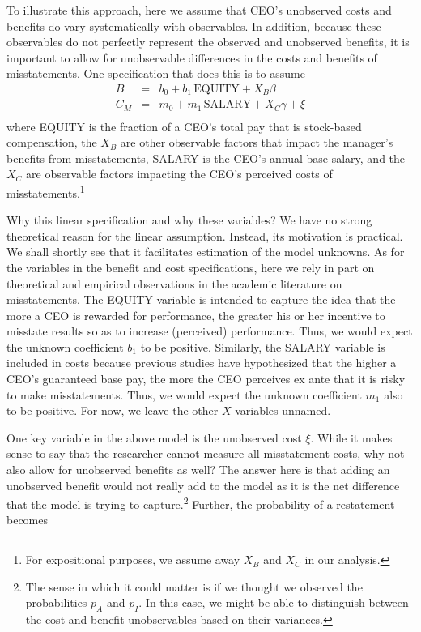 To illustrate this approach, here we assume that CEO's unobserved costs and benefits do vary systematically with observables.
In addition, because these observables do not perfectly represent the observed and unobserved benefits, it is important to allow for unobservable differences in the costs and benefits of misstatements. 
One specification that does this is to assume
\begin{equation}\begin{array}{lcl}\label{eqns1}
B & = & b_0 + b_1 \, \mbox{EQUITY} + X_B\beta\\[.5em]
C_M & = & m_0 + m_1 \, \mbox{SALARY} + X_C\gamma + \xi\\[.5em]
\end{array}
\end{equation}
where EQUITY is the fraction of a CEO's total pay that is stock-based compensation, 
the $X_B$ are other observable factors that impact the manager's benefits from misstatements,
SALARY is the CEO's annual base salary, and the $X_C$ are observable factors impacting the CEO's perceived costs of misstatements.\footnote{
For expositional purposes, we assume away $X_B$ and $X_C$ in our analysis.}

Why this linear specification and why these variables? 
We have no strong theoretical reason for the linear assumption. 
Instead, its motivation is practical.
We shall shortly see that it facilitates estimation of the model unknowns.
As for the variables in the benefit and cost specifications, here we rely in part on theoretical and empirical observations in the academic literature on misstatements. 
The EQUITY variable is intended to capture the idea that the more a CEO is rewarded for performance, the greater his or her incentive to misstate results so as to increase (perceived) performance.
Thus, we would expect the unknown coefficient $b_1$ to be positive.
Similarly, the SALARY variable is included in costs because previous studies have hypothesized that the higher a CEO's guaranteed base pay, the more the CEO perceives ex ante that it is risky to make misstatements.
Thus, we would expect the unknown coefficient $m_1$ also to be positive.
For now, we leave the other $X$ variables unnamed.

One key variable in the above model is the unobserved cost $\xi$.
While it makes sense to say that the researcher cannot measure all misstatement costs, why not also allow for unobserved benefits as well?
The answer here is that adding an unobserved benefit would not really add to the model as it is the net difference that the model is trying to capture.\footnote{
The sense in which it could matter is if we thought we observed the probabilities
$p_A$ and $p_I$.
In this case, we might be able to distinguish between the cost and benefit unobservables based on their variances.}
Further, the probability of a restatement becomes

